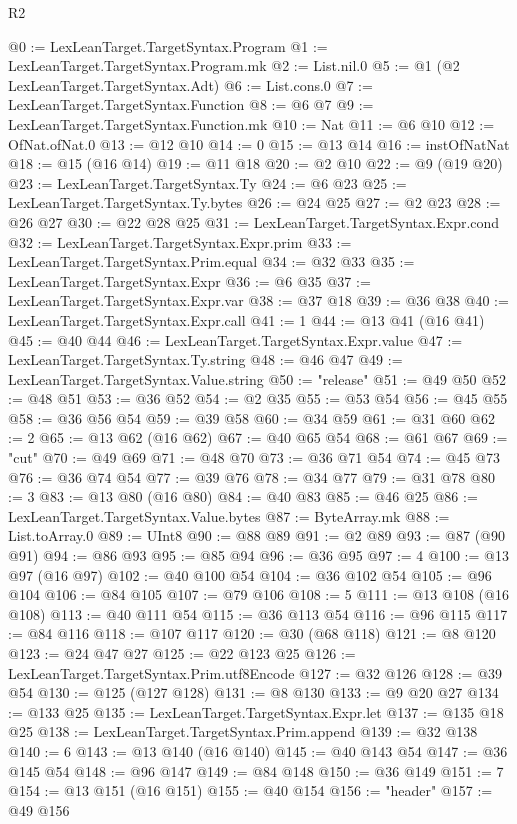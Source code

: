 \begin{lexlean}{R2}
\begin{coremodule}
@0 := LexLeanTarget.TargetSyntax.Program
@1 := LexLeanTarget.TargetSyntax.Program.mk
@2 := List.nil.{0}
@5 := @1 (@2 LexLeanTarget.TargetSyntax.Adt)
@6 := List.cons.{0}
@7 := LexLeanTarget.TargetSyntax.Function
@8 := @6 @7
@9 := LexLeanTarget.TargetSyntax.Function.mk
@10 := Nat
@11 := @6 @10
@12 := OfNat.ofNat.{0}
@13 := @12 @10
@14 := 0
@15 := @13 @14
@16 := instOfNatNat
@18 := @15 (@16 @14)
@19 := @11 @18
@20 := @2 @10
@22 := @9 (@19 @20)
@23 := LexLeanTarget.TargetSyntax.Ty
@24 := @6 @23
@25 := LexLeanTarget.TargetSyntax.Ty.bytes
@26 := @24 @25
@27 := @2 @23
@28 := @26 @27
@30 := @22 @28 @25
@31 := LexLeanTarget.TargetSyntax.Expr.cond
@32 := LexLeanTarget.TargetSyntax.Expr.prim
@33 := LexLeanTarget.TargetSyntax.Prim.equal
@34 := @32 @33
@35 := LexLeanTarget.TargetSyntax.Expr
@36 := @6 @35
@37 := LexLeanTarget.TargetSyntax.Expr.var
@38 := @37 @18
@39 := @36 @38
@40 := LexLeanTarget.TargetSyntax.Expr.call
@41 := 1
@44 := @13 @41 (@16 @41)
@45 := @40 @44
@46 := LexLeanTarget.TargetSyntax.Expr.value
@47 := LexLeanTarget.TargetSyntax.Ty.string
@48 := @46 @47
@49 := LexLeanTarget.TargetSyntax.Value.string
@50 := "release"
@51 := @49 @50
@52 := @48 @51
@53 := @36 @52
@54 := @2 @35
@55 := @53 @54
@56 := @45 @55
@58 := @36 @56 @54
@59 := @39 @58
@60 := @34 @59
@61 := @31 @60
@62 := 2
@65 := @13 @62 (@16 @62)
@67 := @40 @65 @54
@68 := @61 @67
@69 := "cut"
@70 := @49 @69
@71 := @48 @70
@73 := @36 @71 @54
@74 := @45 @73
@76 := @36 @74 @54
@77 := @39 @76
@78 := @34 @77
@79 := @31 @78
@80 := 3
@83 := @13 @80 (@16 @80)
@84 := @40 @83
@85 := @46 @25
@86 := LexLeanTarget.TargetSyntax.Value.bytes
@87 := ByteArray.mk
@88 := List.toArray.{0}
@89 := UInt8
@90 := @88 @89
@91 := @2 @89
@93 := @87 (@90 @91)
@94 := @86 @93
@95 := @85 @94
@96 := @36 @95
@97 := 4
@100 := @13 @97 (@16 @97)
@102 := @40 @100 @54
@104 := @36 @102 @54
@105 := @96 @104
@106 := @84 @105
@107 := @79 @106
@108 := 5
@111 := @13 @108 (@16 @108)
@113 := @40 @111 @54
@115 := @36 @113 @54
@116 := @96 @115
@117 := @84 @116
@118 := @107 @117
@120 := @30 (@68 @118)
@121 := @8 @120
@123 := @24 @47 @27
@125 := @22 @123 @25
@126 := LexLeanTarget.TargetSyntax.Prim.utf8Encode
@127 := @32 @126
@128 := @39 @54
@130 := @125 (@127 @128)
@131 := @8 @130
@133 := @9 @20 @27
@134 := @133 @25
@135 := LexLeanTarget.TargetSyntax.Expr.let
@137 := @135 @18 @25
@138 := LexLeanTarget.TargetSyntax.Prim.append
@139 := @32 @138
@140 := 6
@143 := @13 @140 (@16 @140)
@145 := @40 @143 @54
@147 := @36 @145 @54
@148 := @96 @147
@149 := @84 @148
@150 := @36 @149
@151 := 7
@154 := @13 @151 (@16 @151)
@155 := @40 @154
@156 := "header"
@157 := @49 @156

\end{coremodule}
\end{lexlean}
